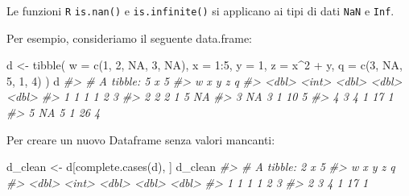 \documentclass[
]{memoir}
\newenvironment{Shaded}{\begin{snugshade}}{\end{snugshade}}
\newcommand{\AttributeTok}[1]{\textcolor[rgb]{0.77,0.63,0.00}{#1}}
\newcommand{\CommentTok}[1]{\textcolor[rgb]{0.56,0.35,0.01}{\textit{#1}}}
\newcommand{\ConstantTok}[1]{\textcolor[rgb]{0.00,0.00,0.00}{#1}}
\newcommand{\DecValTok}[1]{\textcolor[rgb]{0.00,0.00,0.81}{#1}}
\newcommand{\FunctionTok}[1]{\textcolor[rgb]{0.00,0.00,0.00}{#1}}
\newcommand{\NormalTok}[1]{#1}
\newcommand{\OtherTok}[1]{\textcolor[rgb]{0.56,0.35,0.01}{#1}}
\newcommand{\SpecialCharTok}[1]{\textcolor[rgb]{0.00,0.00,0.00}{#1}}
\theoremstyle{definition}
\theoremstyle{definition}
\theoremstyle{definition}
\theoremstyle{definition}
\theoremstyle{remark}
\begin{document}
Le funzioni \texttt{R} \texttt{is.nan()} e \texttt{is.infinite()} si applicano ai tipi di dati \texttt{NaN} e \texttt{Inf}.

Per esempio, consideriamo il seguente data.frame:

\begin{Shaded}
\begin{Highlighting}[]
\NormalTok{d }\OtherTok{\textless{}{-}} \FunctionTok{tibble}\NormalTok{(}
  \AttributeTok{w =} \FunctionTok{c}\NormalTok{(}\DecValTok{1}\NormalTok{, }\DecValTok{2}\NormalTok{, }\ConstantTok{NA}\NormalTok{, }\DecValTok{3}\NormalTok{, }\ConstantTok{NA}\NormalTok{),}
  \AttributeTok{x =} \DecValTok{1}\SpecialCharTok{:}\DecValTok{5}\NormalTok{,}
  \AttributeTok{y =} \DecValTok{1}\NormalTok{,}
  \AttributeTok{z =}\NormalTok{ x}\SpecialCharTok{\^{}}\DecValTok{2} \SpecialCharTok{+}\NormalTok{ y,}
  \AttributeTok{q =} \FunctionTok{c}\NormalTok{(}\DecValTok{3}\NormalTok{, }\ConstantTok{NA}\NormalTok{, }\DecValTok{5}\NormalTok{, }\DecValTok{1}\NormalTok{, }\DecValTok{4}\NormalTok{)}
\NormalTok{)}
\NormalTok{d}
\CommentTok{\#\textgreater{} \# A tibble: 5 x 5}
\CommentTok{\#\textgreater{}       w     x     y     z     q}
\CommentTok{\#\textgreater{}   \textless{}dbl\textgreater{} \textless{}int\textgreater{} \textless{}dbl\textgreater{} \textless{}dbl\textgreater{} \textless{}dbl\textgreater{}}
\CommentTok{\#\textgreater{} 1     1     1     1     2     3}
\CommentTok{\#\textgreater{} 2     2     2     1     5    NA}
\CommentTok{\#\textgreater{} 3    NA     3     1    10     5}
\CommentTok{\#\textgreater{} 4     3     4     1    17     1}
\CommentTok{\#\textgreater{} 5    NA     5     1    26     4}
\end{Highlighting}
\end{Shaded}

\begin{Shaded}
\end{Shaded}

Per creare un nuovo Dataframe senza valori mancanti:

\begin{Shaded}
\begin{Highlighting}[]
\NormalTok{d\_clean }\OtherTok{\textless{}{-}}\NormalTok{ d[}\FunctionTok{complete.cases}\NormalTok{(d), ]}
\NormalTok{d\_clean}
\CommentTok{\#\textgreater{} \# A tibble: 2 x 5}
\CommentTok{\#\textgreater{}       w     x     y     z     q}
\CommentTok{\#\textgreater{}   \textless{}dbl\textgreater{} \textless{}int\textgreater{} \textless{}dbl\textgreater{} \textless{}dbl\textgreater{} \textless{}dbl\textgreater{}}
\CommentTok{\#\textgreater{} 1     1     1     1     2     3}
\CommentTok{\#\textgreater{} 2     3     4     1    17     1}
\end{Highlighting}
\end{Shaded}
\end{document}
